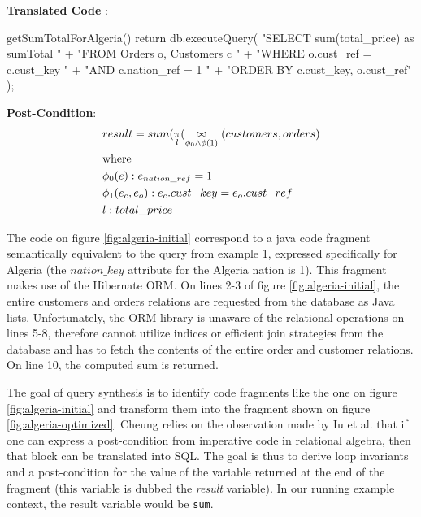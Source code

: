 \begin{figure*}[h]
\begin{minipage}{0.45\textwidth}
\centering
\textbf{Translated Code} :
\begin{Java}[basicstyle=\small]
  getSumTotalForAlgeria() {
  return db.executeQuery(
    "SELECT sum(total_price) as sumTotal " +
    "FROM Orders o, Customers c " +
    "WHERE o.cust_ref = c.cust_key " +
    "AND c.nation_ref = 1 " +
    "ORDER BY c.cust_key, o.cust_ref"
  );
}
\end{Java}
\caption{Post-Condition and code fragment converted to SQL}
\label{fig:algeria-optimized}
\end{minipage} \hfill
\begin{minipage}{0.45\textwidth} 
\centering
\textbf{Post-Condition}:
\begin{align}
\begin{split}
\centering
& result = sum(\underset{l}{\pi}(\underset{\phi_0 \wedge \phi(1)}{\bowtie}(customers, orders) \\
& \text{where} \\
& \phi_0(e) : e_{nation\_ref} = 1 \\
& \phi_1(e_c, e_o) : e_c.cust\_key = e_o.cust\_ref \\
& l : total\_price
\end{split}
 \label{eq:postcondition}
\end{align}
\end{minipage} \hfill
\end{figure*}

The code on figure \ref{fig:algeria-initial} correspond to a java code fragment semantically equivalent to the query from example 1, expressed specifically for Algeria (the $nation\_key$ attribute for the Algeria nation is 1). This fragment makes use of the Hibernate \cite{hibernate} ORM. On lines 2-3 of figure \ref{fig:algeria-initial}, the entire customers and orders relations are requested from the database as Java lists. Unfortunately, the ORM library is unaware of the relational operations on lines 5-8, therefore cannot utilize indices or efficient join strategies from the database and has to fetch the contents of the entire order and customer relations. On line 10, the computed sum is returned. 

The goal of query synthesis is to identify code fragments like the one on figure \ref{fig:algeria-initial} and transform them into the fragment shown on figure \ref{fig:algeria-optimized}. Cheung relies on the observation made by Iu et al. \cite{iu:2010aa} that if one can express a post-condition from imperative code in relational algebra, then that block can be translated into SQL. The goal is thus to derive loop invariants and a post-condition for the value of the variable returned at the end of the fragment (this variable is dubbed the \emph{result} variable). In our running example context, the result variable would be \texttt{sum}. 

